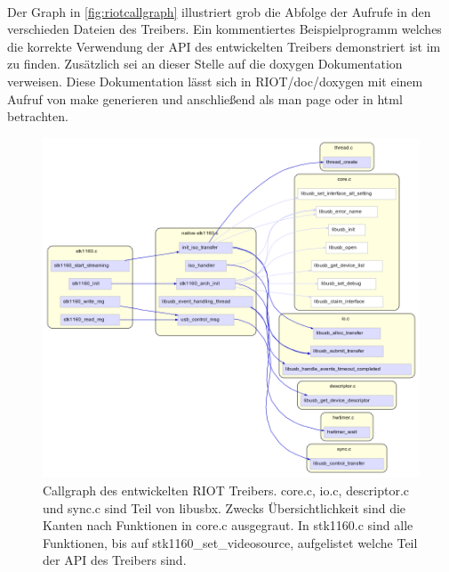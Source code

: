 \paragraph{}
Der Graph in \autoref{fig:riotcallgraph} illustriert grob die Abfolge der Aufrufe in den verschieden Dateien des Treibers. Ein kommentiertes Beispielprogramm welches die korrekte Verwendung der API des entwickelten Treibers demonstriert ist im \projectsrepo{} zu finden. Zusätzlich sei an dieser Stelle auf die doxygen Dokumentation verweisen. Diese Dokumentation lässt sich in RIOT/doc/doxygen mit einem Aufruf von make generieren und anschließend als man page oder in html betrachten.
\begin{figure}[htbp]
 \centering
 \includegraphics[scale=0.63]{./ClusterCallButterflyGraph-native-stk1160-c-highlighted.png}
 \caption{Callgraph des entwickelten RIOT Treibers. core.c, io.c, descriptor.c und sync.c sind Teil von libusbx. Zwecks Übersichtlichkeit sind die Kanten nach Funktionen in core.c ausgegraut. In stk1160.c sind alle Funktionen, bis auf stk1160\_set\_videosource, aufgelistet welche Teil der API des Treibers sind.}
 \label{fig:riotcallgraph}
\end{figure}
\restoregeometry
